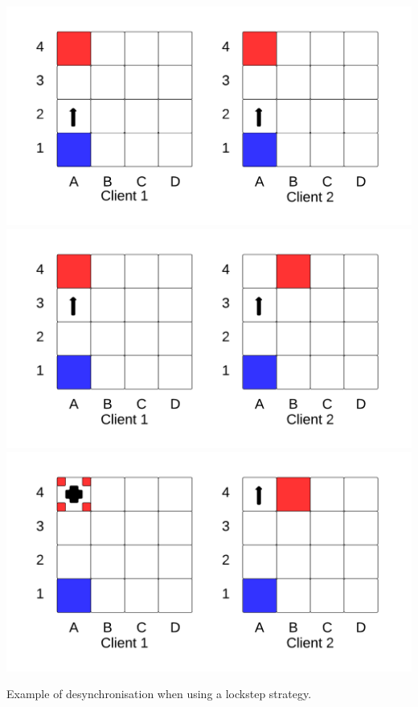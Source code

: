 \begin{marginfigure}
	\includegraphics{res/computer_communication_architecture/ServerClientDesynchronisation1.pdf}
	\includegraphics{res/computer_communication_architecture/ServerClientDesynchronisation2.pdf}
	\includegraphics{res/computer_communication_architecture/ServerClientDesynchronisation3.pdf}		
	\caption[Desynchronisation when using lockstep]{Example of desynchronisation when using a lockstep strategy.}
	\label{fig:serverClientDesync}
\end{marginfigure}

